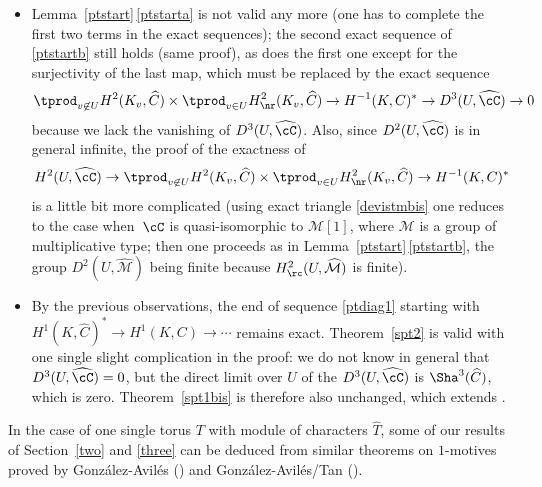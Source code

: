 \begin{rema}
\begin{itemize}
\item Lemma~\ref{ptstart}\,\eqref{ptstarta} is not valid any more (one has to complete
the first two terms in the exact sequences); the second exact sequence
of \eqref{ptstartb} still holds (same proof),
as does the first one except for the surjectivity of the last map,
which must be replaced by the exact sequence\vspace*{-3pt}\enlargethispage{\baselineskip}%
\[
\tprod_{v \not \in U} H^2(K_v,\widehat C) \times \tprod_{v \in U}
H^2_{\nr}(K_v,\widehat C) \to H^{-1}(K,C)^* \to D^3(U,\widehat \cC) \to 0
\]
because we lack the vanishing of $D^3(U,\widehat \cC)$.
Also, since $D^2(U,\widehat \cC)$ is in general infinite,
the proof of the exactness of\vspace*{-3pt}
\[
H^2(U,\widehat \cC) \to \tprod_{v \not \in U} H^2(K_v,\widehat C)
\times \tprod_{v \in U}
H^2_{\nr}(K_v,\widehat C) \to H^{-1}(K,C)^*
\]
is a little bit more complicated (using exact triangle \eqref{devistmbis}
one reduces
to the case when~$\cC$ is quasi-isomorphic to $\mathcal M[1]$, where
$\mathcal M$ is a group of multiplicative type; then one proceeds as in
Lemma~\ref{ptstart}\,\eqref{ptstartb}, the group $D^2(U,\widehat {\mathcal M})$ being finite
because $H^2_\rc(U,\widehat {\mathcal M})$ is finite).

\item By the previous observations, the end of sequence \eqref{ptdiag1}
starting
with $H^1(K,\widehat C)^*\!\to H^1(K,C) \to\cdots$ remains exact.
Theorem~\ref{spt2} is valid with one single slight complication in the
proof: we do not know in general that $D^3(U,\widehat \cC)=0$,
but the direct limit over $U$ of the $D^3(U,\widehat \cC)$ is
$\Sha^3(\widehat C)$, which is zero. Theorem~\ref{spt1bis} is therefore also
unchanged, which extends \cite[Th.\,6.1 \& 6.3]{demphd}.
\end{itemize}
\end{rema}

\begin{rema}
In the case of one single torus $T$ with module of characters
$\widehat T$, some of our results of Section~\ref{two} and \ref{three}
can be deduced from similar theorems on $1$-motives proved by
González-Avilés (\cite[Th.\,6.6]{gonz1}) and González-Avilés/Tan
(\cite[Th.\,3.11]{gonz2}).\vspace*{-3pt}
\end{rema}

